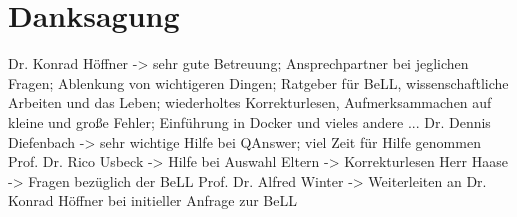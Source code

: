


\bigskip

\begingroup
\let\clearpage\relax
\let\cleardoublepage\relax
\let\cleardoublepage\relax
\chapter*{Danksagung}

Dr. Konrad Höffner -> sehr gute Betreuung; Ansprechpartner bei jeglichen Fragen; Ablenkung von wichtigeren Dingen; Ratgeber für BeLL, wissenschaftliche Arbeiten und das Leben; wiederholtes Korrekturlesen, Aufmerksammachen auf kleine und große Fehler; Einführung in Docker und vieles andere ...
Dr. Dennis Diefenbach -> sehr wichtige Hilfe bei QAnswer; viel Zeit für Hilfe genommen
Prof. Dr. Rico Usbeck -> Hilfe bei Auswahl
Eltern -> Korrekturlesen
Herr Haase -> Fragen bezüglich der BeLL
Prof. Dr. Alfred Winter -> Weiterleiten an Dr. Konrad Höffner bei initieller Anfrage zur BeLL

\endgroup
